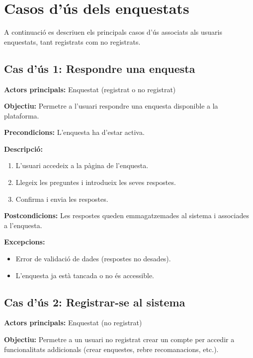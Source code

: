 \documentclass[../main.tex]{subfiles}
\begin{document}
\section{Casos d’ús dels enquestats}
A continuació es descriuen els principals casos d’ús associats als usuaris enquestats, 
tant registrats com no registrats.


\subsection*{Cas d’ús 1: Respondre una enquesta}

\textbf{Actors principals:} Enquestat (registrat o no registrat)

\textbf{Objectiu:} Permetre a l’usuari respondre una enquesta disponible a la plataforma.

\textbf{Precondicions:}  
L’enquesta ha d’estar activa.

\textbf{Descripció:}
\begin{enumerate}
    \item L’usuari accedeix a la pàgina de l’enquesta.
    \item Llegeix les preguntes i introdueix les seves respostes.
    \item Confirma i envia les respostes.
\end{enumerate}

\textbf{Postcondicions:}  
Les respostes queden emmagatzemades al sistema i associades a l’enquesta.

\textbf{Excepcions:}
\begin{itemize}
    \item Error de validació de dades (respostes no desades).
    \item L’enquesta ja està tancada o no és accessible.
\end{itemize}


\subsection*{Cas d’ús 2: Registrar-se al sistema}

\textbf{Actors principals:} Enquestat (no registrat)

\textbf{Objectiu:} Permetre a un usuari no registrat crear un compte per accedir a funcionalitats addicionals (crear enquestes, rebre recomanacions, etc.).
\end{document}
